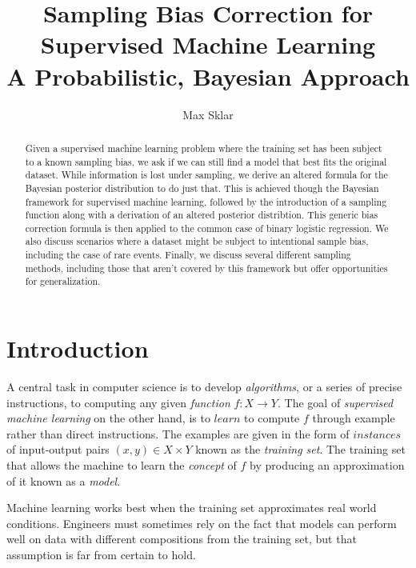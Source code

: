\documentclass[twoside]{article}
\begin{document}
\parindent=0in
\parskip=12pt


\title{
  Sampling Bias Correction for Supervised Machine Learning \\
  \large{
    A  Probabilistic, Bayesian Approach
  }
}

\author{Max Sklar}

\maketitle
\thispagestyle{empty}

\begin{abstract}
Given a supervised machine learning problem where the training set has been subject to a known sampling bias, we ask if we can still find a model that best fits the original dataset. While information is lost under sampling, we derive an altered formula for the Bayesian posterior distribution to do just that. This is achieved though the Bayesian framework for supervised machine learning, followed by the introduction of a sampling function along with a derivation of an altered posterior distribtion. This generic bias correction formula is then applied to the common case of binary logistic regression. We also discuss scenarios where a dataset might be subject to intentional sample bias, including the case of rare events. Finally, we discuss several different sampling methods, including those that aren’t covered by this framework but offer opportunities for generalization.
\end{abstract}

\section{Introduction}
\label{section:introduction}

A central task in computer science is to develop \textit{algorithms}, or a series of precise instructions, to computing any given \textit{function} \(f: X \to Y\). The goal of \textit{supervised machine learning} on the other hand, is to \(learn\) to compute \(f\) through example rather than direct instructions. The examples are given in the form of \(instances\) of input-output pairs \((x, y) \in X \times Y\) known as the \textit{training set}. The training set that allows the machine to learn the \textit{concept} of \(f\) by producing an approximation of it known as a \textit{model}.

Machine learning works best when the training set approximates real world conditions. Engineers must sometimes rely on the fact that models can perform well on data with different compositions from the training set, but that assumption is far from certain to hold.
\end{document}

